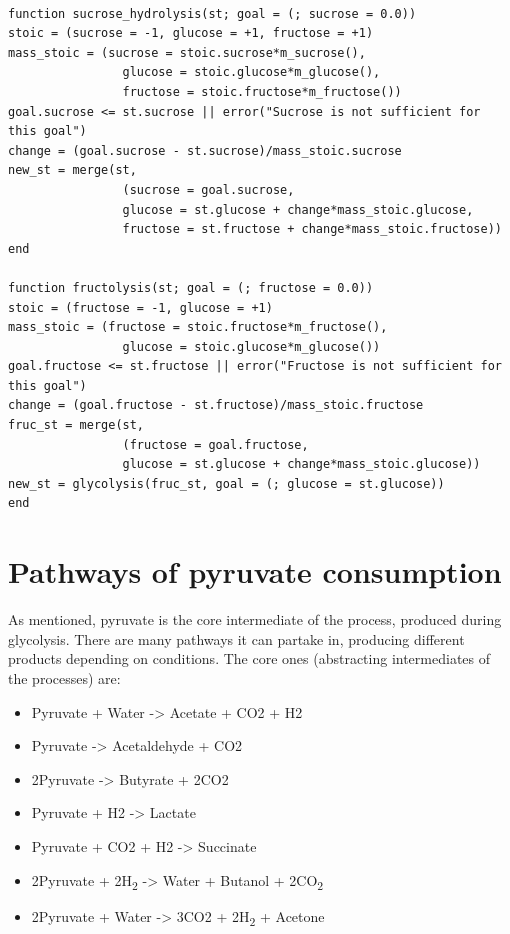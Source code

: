 \documentclass[11pt]{article}
\begin{document}
\begin{verbatim}

function sucrose_hydrolysis(st; goal = (; sucrose = 0.0))
stoic = (sucrose = -1, glucose = +1, fructose = +1)
mass_stoic = (sucrose = stoic.sucrose*m_sucrose(),
                glucose = stoic.glucose*m_glucose(),
                fructose = stoic.fructose*m_fructose())
goal.sucrose <= st.sucrose || error("Sucrose is not sufficient for this goal")
change = (goal.sucrose - st.sucrose)/mass_stoic.sucrose
new_st = merge(st,
                (sucrose = goal.sucrose,
                glucose = st.glucose + change*mass_stoic.glucose,
                fructose = st.fructose + change*mass_stoic.fructose))
end

function fructolysis(st; goal = (; fructose = 0.0))
stoic = (fructose = -1, glucose = +1)
mass_stoic = (fructose = stoic.fructose*m_fructose(),
                glucose = stoic.glucose*m_glucose())
goal.fructose <= st.fructose || error("Fructose is not sufficient for this goal")
change = (goal.fructose - st.fructose)/mass_stoic.fructose
fruc_st = merge(st,
                (fructose = goal.fructose,
                glucose = st.glucose + change*mass_stoic.glucose))
new_st = glycolysis(fruc_st, goal = (; glucose = st.glucose))
end

\end{verbatim}

\section{Pathways of pyruvate consumption}
\label{sec:org1a642eb}
As mentioned, pyruvate is the core intermediate of the process, produced during glycolysis. There are many pathways it can partake in, producing different products depending on conditions. The core ones (abstracting intermediates of the processes) are:

\begin{itemize}
\item Pyruvate + Water -> Acetate + CO2 + H2
\item Pyruvate -> Acetaldehyde + CO2
\item 2Pyruvate -> Butyrate + 2CO2
\item Pyruvate + H2 -> Lactate
\item Pyruvate + CO2 + H2 -> Succinate
\item 2Pyruvate + 2H\textsubscript{2} -> Water + Butanol + 2CO\textsubscript{2}
\item 2Pyruvate + Water -> 3CO2 + 2H\textsubscript{2} + Acetone
\end{itemize}
\end{document}
